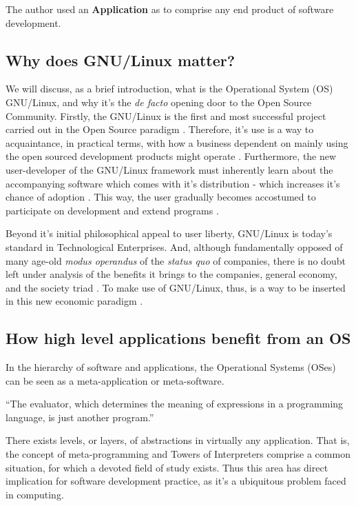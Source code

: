 \documentclass[
12pt,				%
openright,			%
oneside,			%
a4paper,			%
brazil,				%
english,			%
]{abntex2}
\begin{document}
The author used an \textbf{Application} as to comprise any end product of software development.

\subsection{Why does GNU/Linux matter?}

We will discuss, as a brief introduction, what is the Operational System
(OS) GNU/Linux, and why it's the \textit{de facto} opening door to the
Open Source Community. Firstly, the GNU/Linux is the first and most
successful project carried out in the Open Source paradigm
\cite{tu2000evolution,west2001open}. Therefore, it's use is a way to
acquaintance, in practical terms, with how a business dependent on mainly
using the open sourced development products might operate \cite{fink2003business}.   
Furthermore, the new user-developer of the GNU/Linux framework must
inherently learn about the accompanying software which comes with it's
distribution - which increases it's chance of adoption
\cite{west2001open}. This way, the user gradually becomes accostumed to
participate on development and extend programs \cite{hertel2003motivation}.

Beyond it's initial philosophical appeal to user liberty, GNU/Linux is
today's standard in Technological Enterprises. And, although
fundamentally opposed of many age-old \textit{modus operandus} of the
\textit{status quo} of companies, there is no doubt left under
analysis of the benefits it brings to the companies, general economy, and
the society triad \cite{moody2009rebel}. To make use of GNU/Linux,
thus, is a way to be inserted in this new economic paradigm \cite{hippel2003open,peters2009open}.

\subsection{How high level applications benefit from an OS}

In the hierarchy of software and applications, the Operational Systems (OSes) can be seen as a meta-application or meta-software. 

``The evaluator, which determines the meaning of expressions in a
programming language, is just another program.'' \cite{abelson1996structure}

There exists levels, or layers, of abstractions in virtually any
application. That is, the concept of meta-programming and Towers of
Interpreters comprise a common situation, for which a devoted field of
study exists. Thus this area has direct implication for software
development practice, as it's a ubiquitous problem faced in computing.
\end{document}
